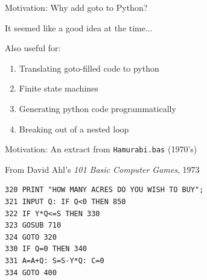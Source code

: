 \documentclass{beamer}
\begin{document}
\begin{frame}{Motivation: Why add goto to Python?}

It seemed like a good idea at the time...
\vspace{1cm}

Also useful for:
\begin{enumerate}
\item Translating goto-filled code to python
\item Finite state machines
\item Generating python code programmatically
\item Breaking out of a nested loop
\end{enumerate}

\end{frame}
%
%

\begin{frame}[fragile]{Motivation: An extract from \texttt{Hamurabi.bas} (1970's)}

From David Ahl's \emph{101 Basic Computer Games}, 1973

\vspace{1cm}

\begin{verbatim}
320 PRINT "HOW MANY ACRES DO YOU WISH TO BUY";
321 INPUT Q: IF Q<0 THEN 850
322 IF Y*Q<=S THEN 330
323 GOSUB 710
324 GOTO 320
330 IF Q=0 THEN 340
331 A=A+Q: S=S-Y*Q: C=0
334 GOTO 400
\end{verbatim}

\end{frame}
\end{document}
